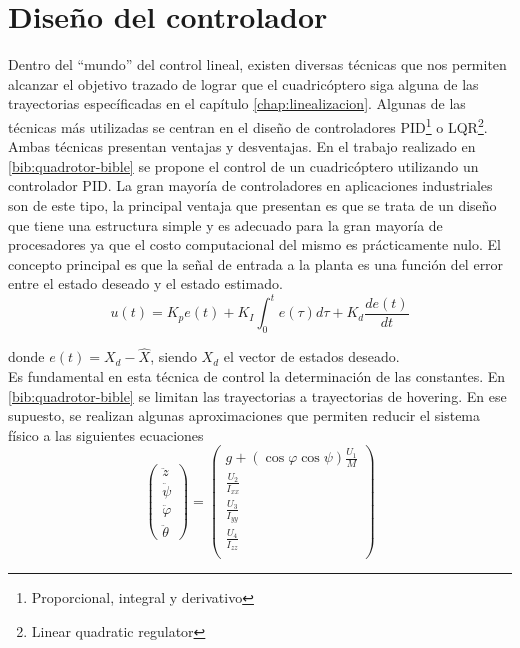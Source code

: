 \documentclass[main]{subfiles}
\begin{document}
\chapter{Diseño del controlador}
\label{chap:control}

Dentro del ``mundo'' del control lineal, existen diversas t\'ecnicas que nos permiten alcanzar el objetivo trazado de lograr que el cuadric\'optero siga alguna de las trayectorias espec\'ificadas en el cap\'itulo \ref{chap:linealizacion}. Algunas de las t\'ecnicas m\'as utilizadas se centran en el diseño de controladores PID\footnote{Proporcional, integral y derivativo} o LQR\footnote{Linear quadratic regulator}. Ambas t\'ecnicas presentan ventajas y desventajas. En el trabajo realizado en \ref{bib:quadrotor-bible} se propone el control de un cuadric\'optero utilizando un controlador PID. La gran mayor\'ia de controladores en aplicaciones industriales son de este tipo, la principal ventaja que presentan es que se trata de un diseño que tiene una estructura simple y es adecuado para la gran mayor\'ia de procesadores ya que el costo computacional del mismo es pr\'acticamente nulo. El concepto principal es que la señal de entrada a la planta es una funci\'on del error entre el estado deseado y el estado estimado.
\begin{equation}
u(t) = K_pe(t)+K_I\int_0^t e(\tau) d\tau +K_d\frac{de(t)}{dt}
\end{equation}

donde $e(t) = X_d-\hat{X}$, siendo $X_d$ el vector de estados deseado.\\

Es fundamental en esta t\'ecnica de control la determinaci\'on de las constantes. En \ref{bib:quadrotor-bible} se limitan las trayectorias a trayectorias de hovering. En ese supuesto, se realizan algunas aproximaciones que permiten reducir el sistema f\'isico a las siguientes ecuaciones
\begin{equation}
\left(
\begin{array}{c}
\ddot{z}\\
\ddot{\psi}\\
\ddot{\varphi} \\
\ddot{\theta}
\end{array}\right)
=\left(\begin{array}{c}
g+(\cos\varphi\cos\psi)\frac{U_1}{M}\\
 \frac{U_2}{I_{xx}} \\
 \frac{U_3}{I_{yy}} \\
 \frac{U_4}{I_{zz}} \\
\end{array}\right)
\end{equation}
\end{document}
